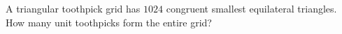 A triangular toothpick grid has $1024$ congruent smallest equilateral triangles. How many unit toothpicks form the entire grid?
